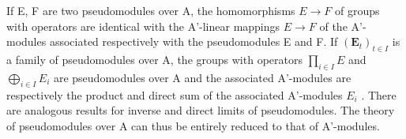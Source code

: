 If E, F are two pseudomodules over A, the homomorphisms \(E \rightarrow F\) of groups with operators are identical with the A'-linear mappings \(E \rightarrow F\) of the A'-modules associated respectively with the pseudomodules E and F. If \((\mathbf{E}_{t})_{t \in I}\) is a family of pseudomodules over A, the groups with operators \(\prod_{i\in I}E\) and \(\bigoplus_{i\in I}E_{i}\) are pseudomodules over A and the associated A'-modules are respectively the product and direct sum of the associated A'-modules \(E_{i}\) . There are analogous results for inverse and direct limits of pseudomodules. The theory of pseudomodules over A can thus be entirely reduced to that of A'-modules.

\BourbakiExercisesHeading
